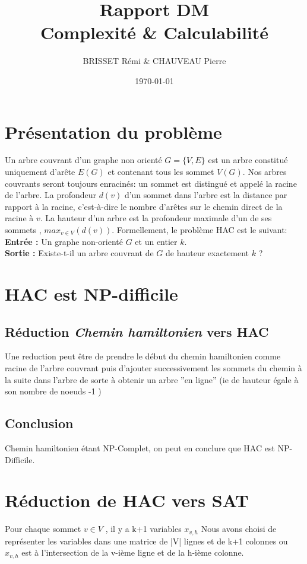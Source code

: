 \documentclass[12pt,a4paper]{article}
\title{Rapport DM \\
Complexité \& Calculabilité}
\author{BRISSET Rémi \& CHAUVEAU Pierre}
\date{\today}
\begin{document}
\maketitle
\tableofcontents
\newpage

\section{Présentation du problème}
Un arbre couvrant d'un graphe non orienté $G =\{V,E\}$ est un arbre constitué uniquement d'arête $E(G)$ et contenant tous les sommet $V(G)$. Nos  arbres couvrants seront toujours enracinés: un sommet est distingué et appelé la racine de l’arbre. La profondeur $d(v)$ d’un sommet dans l’arbre est la distance par rapport à la racine, c’est-à-dire le nombre d’arêtes sur le chemin direct de la racine à $v$. La hauteur d’un arbre est la profondeur maximale d’un de ses sommets , $max_{v\in V}(d(v))$. Formellement, le problème HAC est le suivant: \\
\indent \textbf{Entrée : } Un graphe non-orienté $G$ et un entier $k$. \\
\indent \textbf{Sortie : }Existe-t-il un arbre couvrant de $G$ de hauteur exactement $k$ ?\\

\section{HAC est NP-difficile}
\subsection{Réduction \textit{Chemin hamiltonien} vers HAC}

Une reduction peut être de prendre le début du chemin hamiltonien comme racine de l'arbre couvrant puis d'ajouter successivement les sommets du chemin à la suite dans l'arbre de sorte à obtenir un arbre ''en ligne'' (ie de hauteur égale à son nombre de noeuds -1 )
\subsection{Conclusion}

Chemin hamiltonien étant NP-Complet, on peut en conclure que HAC est NP-Difficile.

\newpage
\section{Réduction de HAC vers SAT}
Pour chaque sommet $v \in V$ , il y a k+1 variables $x_{v,h}$
Nous avons choisi de représenter les variables dans une matrice de |V| lignes et de k+1 colonnes ou $x_{v,h}$ est à l'intersection de la v-ième ligne et de la h-ième colonne.
\\
\end{document}

